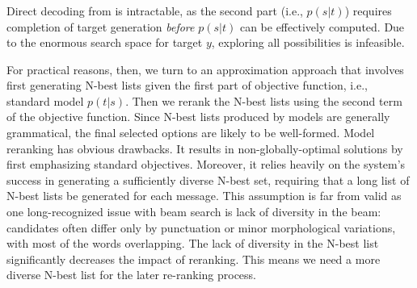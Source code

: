 \subsubsection{\mmiBD}
Direct decoding from \mmiBDv is intractable, as the second part (i.e., $p(s|t)$) requires completion of 
target generation \textit{before} $p(s|t)$ can be effectively computed.
Due to the enormous search space for target $y$, exploring all possibilities is infeasible. 

For practical reasons, then, we turn to an approximation approach that involves first generating \mbox{N-best} lists given the first part of objective function, i.e., 
standard \sts model $p(t|s)$. 
Then we rerank the \mbox{N-best} lists using the second term of the objective function. 
Since N-best lists produced by \sts models are generally grammatical, the final selected options are likely to be well-formed. 
Model reranking has obvious drawbacks. It results in non-globally-optimal solutions by first emphasizing standard \sts objectives. 
Moreover, it relies heavily on the system's success in generating a sufficiently diverse N-best set, requiring that a long list of N-best lists be generated for each message. 
This assumption is far from valid as one long-recognized issue with beam search is
lack of diversity in the beam: candidates often differ
only by punctuation or minor morphological variations,
with most of the words overlapping. 
The lack
of diversity in the N-best list significantly decreases
the impact of reranking. This means we need a more diverse N-best list for the later re-ranking process. 

